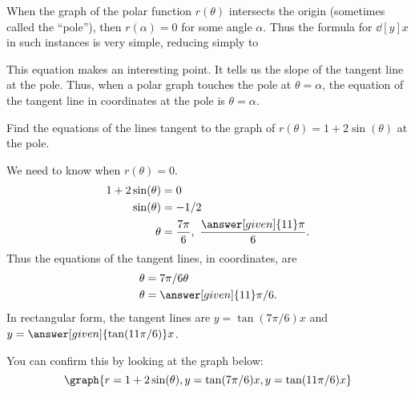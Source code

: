 \documentclass{ximera}
\begin{document}
When the graph of the polar function $r(\theta)$ intersects the origin
(sometimes called the ``pole''), then $r(\alpha)=0$ for some angle
$\alpha$. Thus the formula for $\dd[y]{x}$ in such instances is very
simple, reducing simply to
\begin{multipleChoice} 
\end{multipleChoice}
This equation makes an interesting point. It tells us the slope of the
tangent line at the pole.  Thus, when a polar graph touches the pole
at $\theta=\alpha$, the equation of the tangent line in
 coordinates
at the pole is $\theta=\alpha$.

\begin{example}
  Find the equations of the lines tangent to the graph of
  $r(\theta)=1+2\sin(\theta)$ at the pole.
  \begin{explanation}
    We need to know when $r(\theta)=0$.
    \begin{align*}
      1+2\sin(\theta) &= 0\\
      \sin(\theta) &= -1/2\\
      \theta &= \frac{7\pi}{6},\ \frac{\answer[given]{11}\pi}6.
    \end{align*}
    Thus the equations of the tangent lines, in  coordinates, are
    \begin{align*}
      \theta &=7\pi/6 \theta \\
      \theta &= \answer[given]{11}\pi/6.
    \end{align*}
    In rectangular form, the tangent lines are $y=\tan(7\pi/6)x$ and
    $y=\answer[given]{\tan(11\pi/6)}x$.
    \begin{prompt}
     You can confirm this by looking at the graph below:
     \[
     \graph{r=1+2\sin(\theta),y=\tan(7\pi/6)x,y=\tan(11\pi/6)x}
     \]
   \end{prompt}
  \end{explanation}
\end{example}
\end{document}

